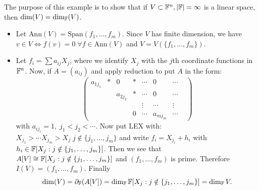 \begin{itemize}
\begin{example}
    The purpose of this example is to show that if $V\subset \mathbb{F}^n,|\mathbb{F}|=\infty$ is a linear space, then 
    $\dim(V)=\dim_{\mathbb{F}}(V)$.
    \begin{itemize}
        \item Let $\text{Ann}(V)=\text{Span}(f_1,\dots, f_m)$. Since $V$ has finite dimension, we have
        $v\in V\iff f(v)=0\;\forall f\in\text{Ann}(V)$ and $V=V(\{f_1,\dots,f_m\})$.
        \item Let $f_i=\sum a_{ij}X_j$, where we identify $X_j$ with the $j$th coordinate functions in $\mathbb{F}^n$. 
        Now, if $A=(a_{ij})$ and apply reduction to put $A$ in the form:
        \begin{equation}
            \begin{pmatrix}
                a_{1j_1}&*&0&*&\cdots&0&\cdots\\
                &&a_{2j_2}&*&\cdots&0&\cdots\\
                &&&&\vdots&\cdots&\vdots&\\
                &&&0&\cdots&a_{mj_m}&\cdots
            \end{pmatrix}
        \end{equation}
        with $a_{ij_i}=1,\;j_1<j_2<\cdots$. Now put LEX with: 
        $X_{j_1}>\cdots X_{j_m}>X_{j}\;j\notin\{j_1,\dots,j_m\}$ and write 
        $f_i = X_{j_i}+h_i$ with $h_i\in\mathbb{F}[X_j:j\notin\{j_1,\dots, j_m\}]$. Then we see that 
        $A[V]\cong\mathbb{F}[X_j:j\notin\{j_1,\dots, j_m\}]$ and $(f_1,\dots,f_m)$ is prime. Therefore 
        $I(V)=(f_1,\dots, f_m)$. Finally 
        \begin{equation}
            \dim(V)=\partial_{\mathbb{F}}(A[V]) = \dim_{\mathbb{F}}\mathbb{F}[X_j:j\notin\{j_1,\dots, j_m\}] = \dim_{\mathbb{F}}V.
        \end{equation}
    \end{itemize}
\end{example}
\end{itemize}


